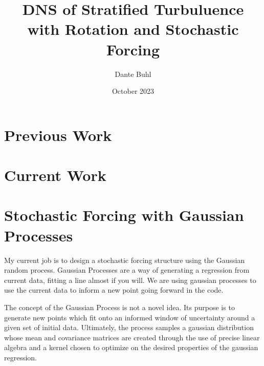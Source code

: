 \documentclass{article}
\title{DNS of Stratified Turbuluence with Rotation and Stochastic Forcing}
\author{Dante Buhl}
\date{October 2023}
\begin{document}
\newcommand{\bs}[1]{\boldsymbol{#1}}
\newcommand{\bmp}[1]{\begin{minipage}{#1\textwidth}}
\newcommand{\emp}{\end{minipage}}
\newcommand{\R}{\mathbb{R}}
\newcommand{\N}{\mathcal{N}}
\newcommand{\K}{\bs{\mathrm{K}}}
\newcommand{\m}{\bs{\mu}_*}
\newcommand{\s}{\bs{\Sigma}_*}

\maketitle

\section{Previous Work}


\section{Current Work}


\section{Stochastic Forcing with Gaussian Processes}
\begin{comment}
 \left[\begin{array}{c c c c c}
    0 & \cdots & 0& \cdots& 0 \\
    \vdots & 0 & 0 & \cdots & 0 \\
    0 & 0 & \lambda_{n_c} & 0 & \vdots \\
    \vdots & \vdots & 0 & \ddots & 0 \\
    0 & 0 & \cdots & 0 & \lambda_{n}
    \end{array}\right]    
\end{comment}

My current job is to design a stochastic forcing structure using the Gaussian random process. Gaussian Processes are a way of generating a regression from current data, fitting a line almost if you will. We are using gaussian processes to use the current data to inform a new point going forward in the code. 

The concept of the Gaussian Process is not a novel idea. Its purpose is to generate new points which fit onto an informed window of uncertainty around a given set of initial data. Ultimately, the process samples a gaussian distribution whose mean and covariance matrices are created through the use of precise linear algebra and a kernel chosen to optimize on the desired properties of the gaussian regression. 
\end{document}
